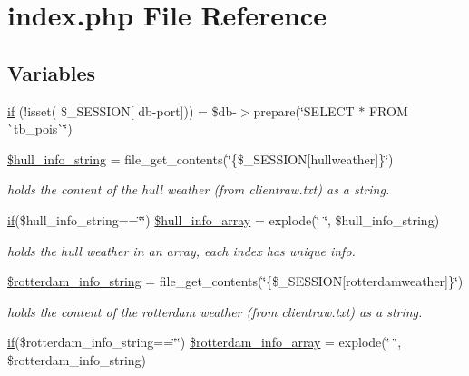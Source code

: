 \hypertarget{index_8php}{}\section{index.\+php File Reference}
\label{index_8php}
\subsection*{Variables}
\begin{DoxyCompactItemize}
\item 
\mbox{\hyperlink{index_8php_ae74920025a5793b6cc131192b92d8066}{if}} (!isset( \$\+\_\+\+S\+E\+S\+S\+I\+ON\mbox{[} \textquotesingle{}db-\/port\textquotesingle{}\mbox{]})) = \$db-\/$>$prepare(\char`\"{}S\+E\+L\+E\+CT $\ast$ F\+R\+OM \`{}tb\+\_\+pois\`{}\char`\"{})
\item 
\mbox{\hyperlink{index_8php_a35ce57643e0a8f4a8bb0c194778fb4e9}{\$hull\+\_\+info\+\_\+string}} = file\+\_\+get\+\_\+contents(\char`\"{}\{\$\+\_\+\+S\+E\+S\+S\+I\+ON\mbox{[}\textquotesingle{}hullweather\textquotesingle{}\mbox{]}\}\char`\"{})
\begin{DoxyCompactList}\small\item\em holds the content of the hull weather (from clientraw.\+txt) as a string. \end{DoxyCompactList}\item 
\mbox{\hyperlink{hull_2index_8php_a8f0d8893361d6307986497540738a8bf}{if}}(\$hull\+\_\+info\+\_\+string==\char`\"{}\char`\"{}) \mbox{\hyperlink{index_8php_a24a4e2c16fb7ceee7c12646ce56597e4}{\$hull\+\_\+info\+\_\+array}} = explode(\char`\"{} \char`\"{}, \$hull\+\_\+info\+\_\+string)
\begin{DoxyCompactList}\small\item\em holds the hull weather in an array, each index has unique info. \end{DoxyCompactList}\item 
\mbox{\hyperlink{index_8php_ab3e2cf8e37214ce4445068e865eaf9bd}{\$rotterdam\+\_\+info\+\_\+string}} = file\+\_\+get\+\_\+contents(\char`\"{}\{\$\+\_\+\+S\+E\+S\+S\+I\+ON\mbox{[}\textquotesingle{}rotterdamweather\textquotesingle{}\mbox{]}\}\char`\"{})
\begin{DoxyCompactList}\small\item\em holds the content of the rotterdam weather (from clientraw.\+txt) as a string. \end{DoxyCompactList}\item 
\mbox{\hyperlink{hull_2index_8php_a8f0d8893361d6307986497540738a8bf}{if}}(\$rotterdam\+\_\+info\+\_\+string==\char`\"{}\char`\"{}) \mbox{\hyperlink{index_8php_a3fad30a9e50ca634f5d9da231e879994}{\$rotterdam\+\_\+info\+\_\+array}} = explode(\char`\"{} \char`\"{}, \$rotterdam\+\_\+info\+\_\+string)

\end{DoxyCompactItemize}
